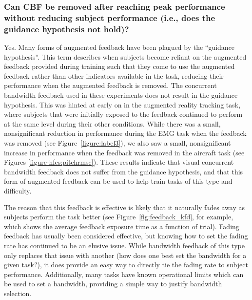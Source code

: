 \subsubsection{Can CBF be removed after reaching peak performance without reducing subject performance (i.e., does the guidance hypothesis not hold)?}
Yes.
Many forms of augmented feedback have been plagued by the ``guidance hypothesis''.
This term describes when subjects become reliant on the augmented feedback provided during training such that they come to use the augmented feedback rather than other indicators available in the task, reducing their performance when the augmented feedback is removed.
The concurrent bandwidth feedback used in these experiments does not result in the guidance hypothesis.
This was hinted at early on in the augmented reality tracking task, where subjects that were initially exposed to the feedback continued to perform at the same level during their other conditions.
While there was a small, nonsignificant reduction in performance during the EMG task when the feedback was removed (see Figure~\ref{figure:label3}), we also saw a small, nonsignificant increase in performance when the feedback was removed in the aircraft task (see Figures \ref{figure-hfes:pitchrmse}).
These results indicate that visual concurrent bandwidth feedback does not suffer from the guidance hypothesis, and that this form of augmented feedback can be used to help train tasks of this type and difficulty.

The reason that this feedback is effective is likely that it naturally fades away as subjects perform the task better (see Figure~\ref{fig:feedback_kfd}, for example, which shows the average feedback exposure time as a function of trial).
Fading feedback has usually been considered effective, but knowing how to set the fading rate has continued to be an elusive issue.
While bandwidth feedback of this type only replaces that issue with another (how does one best set the bandwidth for a given task?), it does provide an easy way to directly tie the fading rate to subject performance.
Additionally, many tasks have known operational limits which can be used to set a bandwidth, providing a simple way to justify bandwidth selection.


